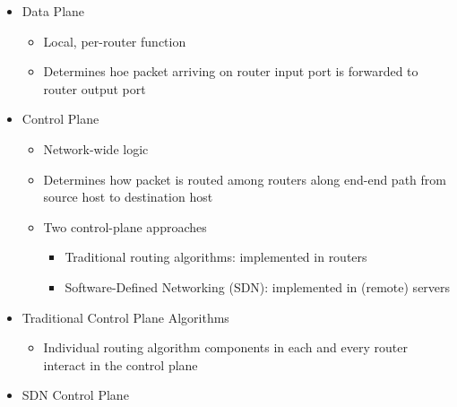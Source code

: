 \begin{itemize}
\begin{itemize}
    \end{itemize}

  \item Data Plane

    \begin{itemize}

      \item Local, per-router function

      \item Determines hoe packet arriving on router input port is forwarded to router output port

    \end{itemize}

  \item Control Plane

    \begin{itemize}

      \item Network-wide logic

      \item Determines how packet is routed among routers along end-end path from source host to destination host

      \item Two control-plane approaches

        \begin{itemize}

          \item Traditional routing algorithms: implemented in routers

          \item Software-Defined Networking (SDN): implemented in (remote) servers

        \end{itemize}

    \end{itemize}

  \item Traditional Control Plane Algorithms

    \begin{itemize}

      \item Individual routing algorithm components in each and every router interact in the control plane

    \end{itemize}

  \item SDN Control Plane

    \begin{itemize}


\end{itemize}
\end{itemize}
